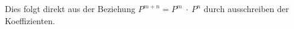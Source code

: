 Dies folgt direkt aus der Beziehung $P^{m+n} = P^{m} \: \cdot \: P^{n}$ durch ausschreiben der Koeffizienten. 